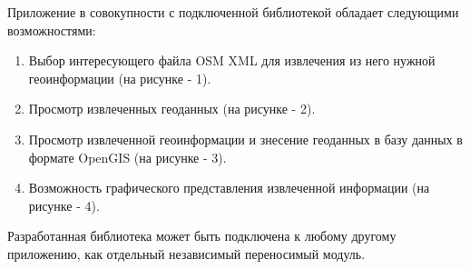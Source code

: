 \documentclass[12pt,a4paper,oneside]{article} %
\begin{document}
Приложение в совокупности с подключенной библиотекой обладает \linebreak
следующими возможностями:
\begin{enumerate}
\item Выбор интересующего файла OSM XML для извлечения из него нужной \linebreak
геоинформации (на рисунке - 1).
\item Просмотр извлеченных геоданных (на рисунке - 2).
\item Просмотр извлеченной геоинформации и знесение геоданных в базу \linebreak
данных в формате OpenGIS (на рисунке - 3).
\item Возможность графического представления извлеченной информации \linebreak
(на рисунке - 4).
\end{enumerate}

Разработанная библиотека может быть подключена к любому другому \linebreak
приложению, как отдельный независимый переносимый модуль.

\newpage
\end{document}
